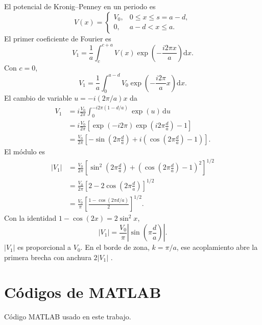 \documentclass[hidelinks]{article}
\begin{document}
El potencial de Kronig--Penney en un periodo es
\begin{equation*}
V(x) = \begin{cases}
V_0, & 0 \leq x \leq s = a-d, \\
0, & a-d < x \leq a.
\end{cases}
\end{equation*}
El primer coeficiente de Fourier es
\begin{equation*}
V_1 = \frac{1}{a} \int_{c}^{c+a} V(x) \exp\left(-\frac{i 2\pi x}{a}\right) \mathrm{d}x.
\end{equation*}
Con $c=0$,
\begin{equation*}
V_1 = \frac{1}{a} \int_{0}^{a-d} V_0 \exp\left(-\frac{i 2\pi}{a}x\right) \mathrm{d}x.
\end{equation*}
El cambio de variable $u=-i(2\pi/a)x$ da
\begin{align*}
V_1 &= i \frac{V_0}{2\pi} \int_{0}^{-i 2\pi\left(1 - d/a\right)} \exp(u)\,\mathrm{d}u \\
&= i \frac{V_0}{2\pi} \left[ \exp(-i 2\pi) \exp\left(i 2\pi \tfrac{d}{a}\right) - 1 \right] \\
&= \frac{V_0}{2\pi} \left[ -\sin\left(2\pi \tfrac{d}{a}\right) + i \left(\cos\left(2\pi \tfrac{d}{a}\right) - 1\right) \right].
\end{align*}
El módulo es
\begin{align*}
|V_1| &= \frac{V_0}{2\pi} \left[ \sin^2\left(2\pi \tfrac{d}{a}\right) + \left(\cos\left(2\pi \tfrac{d}{a}\right) - 1\right)^2 \right]^{1/2} \\
&= \frac{V_0}{2\pi} \left[ 2 - 2\cos\left(2\pi \tfrac{d}{a}\right) \right]^{1/2} \\
&= \frac{V_0}{\pi} \left[ \frac{1 - \cos\left(2\pi d/a\right)}{2} \right]^{1/2}.
\end{align*}
Con la identidad $1-\cos(2x)=2\sin^2 x$,
\begin{equation}
|V_1| = \frac{V_0}{\pi} \left| \sin\left(\pi \frac{d}{a}\right) \right|.
\label{eq:V1}
\end{equation}
$|V_1|$ es proporcional a $V_0$. En el borde de zona, $k=\pi/a$, ese acoplamiento abre la primera brecha con anchura $2|V_1|$ \cite{kittel}.

\clearpage
\onecolumn
\section{Códigos de MATLAB}
\label{ap:codigo}

Código MATLAB usado en este trabajo.
\end{document}
